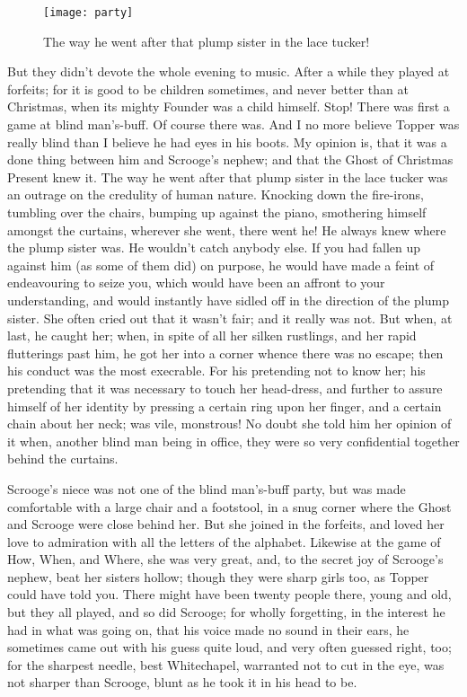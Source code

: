 \begin{figure}[p]
\begin{minipage}[c]{\textwidth}
\texttt{[image: party]}
\caption[\textbf{The way he went after that plump sister!}]{The way he went after that plump sister in the lace tucker!}
\end{minipage}
\end{figure}


But they didn't devote the whole evening to music. After a while they played at forfeits; for it is good to be children sometimes, and never better than at Christmas, when its mighty Foun\-der was a child himself. Stop! There was first a game at blind man's-buff. Of course there was. And I no more believe Topper was really blind than I believe he had eyes in his boots. My opinion is, that it was a done thing between him and Scrooge's nephew; and that the Ghost of Christmas Present knew it. The way he went after that plump sister in the lace tucker was an outrage on the credulity of human nature. Knocking down the fire-irons, tumbling over the chairs, bumping up against the piano, smothering himself amongst the curtains, wherever she went, there went he! He always knew where the plump sister was. He wouldn't catch anybody else. If you had fallen up against him (as some of them did) on purpose, he would have made a feint of endeavouring to seize you, which would have been an affront to your understanding, and would instantly have sidled off in the direction of the plump sister. She often cried out that it wasn't fair; and it really was not. But when, at last, he caught her; when, in spite of all her silken rustlings, and her rapid flutterings past him, he got her into a corner whence there was no escape; then his conduct was the most execrable. For his pretending not to know her; his pretending that it was necessary to touch her head-dress, and further to assure himself of her identity by pressing a certain ring upon her finger, and a certain chain about her neck; was vile, monstrous! No doubt she told him her opinion of it when, another blind man being in office, they were so very confidential together behind the curtains.

Scrooge's niece was not one of the blind man's-buff party, but was made comfortable with a large chair and a footstool, in a snug corner where the Ghost and Scrooge were close behind her. But she joined in the forfeits, and loved her love to admiration with all the letters of the alphabet. Likewise at the game of How, When, and Where, she was very great, and, to the secret joy of Scrooge's nephew, beat her sisters hollow; though they were sharp girls too, as Topper could have told you. There might have been twenty people there, young and old, but they all played, and so did Scrooge; for wholly forgetting, in the interest he had in what was going on, that his voice made no sound in their ears, he sometimes came out with his guess quite loud, and very often guessed right, too; for the sharpest needle, best Whitechapel, warranted not to cut in the eye, was not sharper than Scrooge, blunt as he took it in his head to be.

